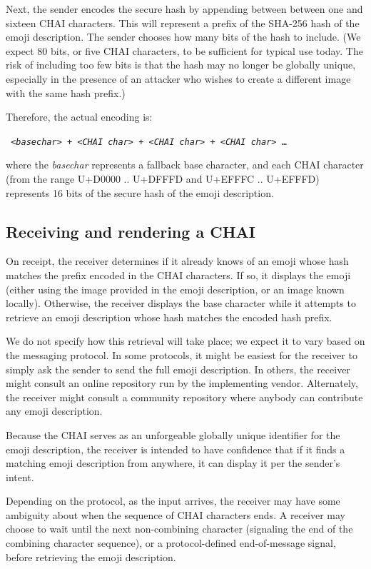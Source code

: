 \documentclass[12pt]{article}
\begin{document}
Next, the sender encodes the secure hash by appending between between
one and sixteen CHAI characters. This will represent a prefix of the
SHA-256 hash of the emoji description. The sender chooses how many
bits of the hash to include. (We expect 80 bits, or five CHAI
characters, to be sufficient for typical use today. The risk of
including too few bits is that the hash may no longer be globally unique,
especially in the presence of an attacker who wishes to create a different
image with the same hash prefix.)

Therefore, the actual encoding is:

\texttt { <\textit{basechar}> + <\textit{CHAI char}> + <\textit{CHAI char}> + <\textit{CHAI char}> \ldots }

where the \textit{basechar} represents a fallback base character, and
each CHAI character (from the range U+D0000 .. U+DFFFD and U+EFFFC
.. U+EFFFD) represents 16 bits of the secure hash of the emoji
description.

\subsection{Receiving and rendering a CHAI}

On receipt, the receiver determines if it already knows of an emoji
whose hash matches the prefix encoded in the CHAI characters. If so,
it displays the emoji (either using the image provided in the emoji
description, or an image known locally). Otherwise, the receiver
displays the base character while it attempts to retrieve an emoji
description whose hash matches the encoded hash prefix.

We do not specify how this retrieval will take place; we expect it to
vary based on the messaging protocol. In some protocols, it might be
easiest for the receiver to simply ask the sender to send the full
emoji description. In others, the receiver might consult an online
repository run by the implementing vendor. Alternately, the receiver
might consult a community repository where anybody can contribute any
emoji description.

Because the CHAI serves as an unforgeable globally unique identifier
for the emoji description, the receiver is intended to have confidence
that if it finds a matching emoji description from anywhere, it can
display it per the sender's intent.

Depending on the protocol, as the input arrives, the receiver may have
some ambiguity about when the sequence of CHAI characters ends.  A
receiver may choose to wait until the next non-combining character
(signaling the end of the combining character sequence), or a
protocol-defined end-of-message signal, before retrieving the emoji
description.
\end{document}

